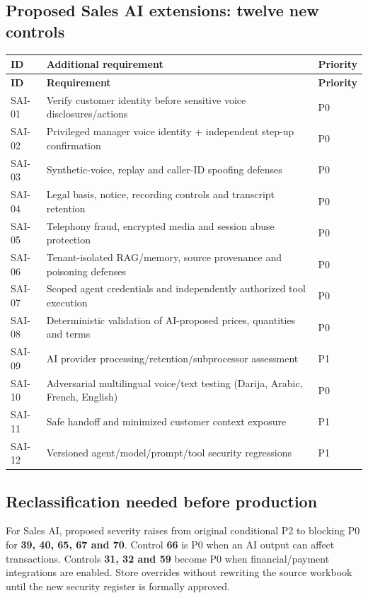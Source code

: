 \documentclass[10.5pt,a4paper,oneside]{article}
\begin{document}
\subsection{Proposed Sales AI extensions: twelve new controls}
\small
\begin{longtable}{@{}L{15mm}L{123mm}L{22mm}@{}}
\toprule{}\textbf{ID} & \textbf{Additional requirement} & \textbf{Priority}\\\midrule
\endfirsthead\toprule{}\textbf{ID} & \textbf{Requirement} & \textbf{Priority}\\\midrule\endhead
SAI-01 & Verify customer identity before sensitive voice disclosures/actions & P0\\
SAI-02 & Privileged manager voice identity + independent step-up confirmation & P0\\
SAI-03 & Synthetic-voice, replay and caller-ID spoofing defenses & P0\\
SAI-04 & Legal basis, notice, recording controls and transcript retention & P0\\
SAI-05 & Telephony fraud, encrypted media and session abuse protection & P0\\
SAI-06 & Tenant-isolated RAG/memory, source provenance and poisoning defenses & P0\\
SAI-07 & Scoped agent credentials and independently authorized tool execution & P0\\
SAI-08 & Deterministic validation of AI-proposed prices, quantities and terms & P0\\
SAI-09 & AI provider processing/retention/subprocessor assessment & P1\\
SAI-10 & Adversarial multilingual voice/text testing (Darija, Arabic, French, English) & P0\\
SAI-11 & Safe handoff and minimized customer context exposure & P1\\
SAI-12 & Versioned agent/model/prompt/tool security regressions & P1\\
\bottomrule\end{longtable}\normalsize
\subsection{Reclassification needed before production}
For Sales AI, proposed severity raises from original conditional P2 to blocking P0 for \textbf{39, 40, 65, 67 and 70}. Control \textbf{66} is P0 when an AI output can affect transactions. Controls \textbf{31, 32 and 59} become P0 when financial/payment integrations are enabled. Store overrides without rewriting the source workbook until the new security register is formally approved.
\end{document}
